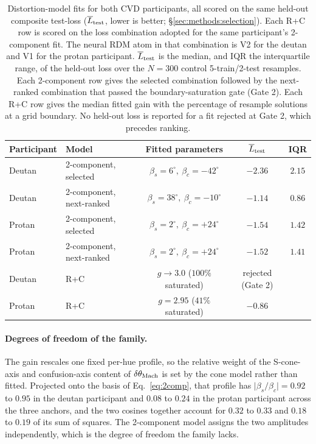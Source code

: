 \begin{table}[ht]
  \caption{Distortion-model fits for both CVD participants, all scored on the same
  held-out composite test-loss ($\overline{L}_{\rm test}$, lower is better;
  \S\ref{sec:methods:selection}). Each R+C row is scored on the loss combination
  adopted for the same participant's 2-component fit. The neural RDM atom in that
  combination is V2 for the deutan and V1 for the protan participant.
  $\overline{L}_{\rm test}$ is the median, and IQR the interquartile range, of the
  held-out loss over the $N = 300$ control 5-train/2-test resamples. Each
  2-component row gives the selected combination followed by the next-ranked
  combination that passed the boundary-saturation gate (Gate 2). Each R+C row
  gives the median fitted gain with the percentage of resample solutions at a grid
  boundary. No held-out loss is reported for a fit rejected at Gate 2, which
  precedes ranking.}
  \label{tab:modelfits}
  \centering
  \small
  \begin{tabular}{llccc}
    \toprule Participant & Model & Fitted parameters & $\overline{L}_{\rm test}$ & IQR \\ \midrule
    Deutan & 2-component, selected & $\beta_s = 6^\circ,\ \beta_c = -42^\circ$ & $-2.36$ & $2.15$ \\
    Deutan & 2-component, next-ranked & $\beta_s = 38^\circ,\ \beta_c = -10^\circ$ & $-1.14$ & $0.86$ \\
    Protan & 2-component, selected & $\beta_s = 2^\circ,\ \beta_c = +24^\circ$ & $-1.54$ & $1.42$ \\
    Protan & 2-component, next-ranked & $\beta_s = 2^\circ,\ \beta_c = +24^\circ$ & $-1.52$ & $1.41$ \\ \midrule
    Deutan & R+C & $g \to 3.0$ ($100\%$ saturated) & rejected (Gate 2) & \\
    Protan & R+C & $g = 2.95$ ($41\%$ saturated) & $-0.86$ & \\ \bottomrule
  \end{tabular}
\end{table}



\paragraph{Degrees of freedom of the family.}
The gain rescales one fixed per-hue profile, so the relative weight of the
S-cone-axis and confusion-axis content of $\delta\theta_{\rm Mach}$ is set by the
cone model rather than fitted. Projected onto the basis of Eq.~\ref{eq:2comp},
that profile has $\lvert\beta_s / \beta_c\rvert = 0.92$ to $0.95$ in the deutan
participant and $0.08$ to $0.24$ in the protan participant across the three
anchors, and the two cosines together account for $0.32$ to $0.33$ and $0.18$ to
$0.19$ of its sum of squares. The 2-component model assigns the two amplitudes
independently, which is the degree of freedom the family lacks.


